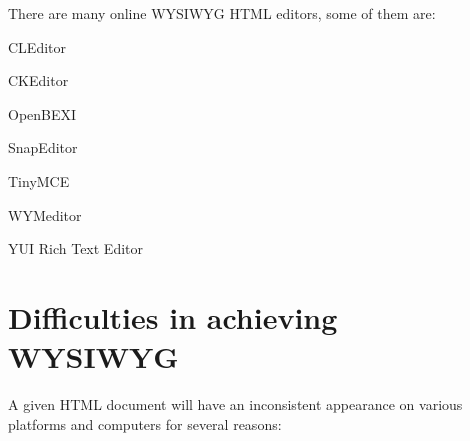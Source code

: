 There are many online WYSIWYG HTML editors, some of them are:

\begin{compactitem}
\item CLEditor
\item CKEditor
\item OpenBEXI
\item SnapEditor
\item TinyMCE
\item WYMeditor
\item YUI Rich Text Editor
\end{compactitem}

\section{Difficulties in achieving WYSIWYG}


A given HTML document will have an inconsistent appearance on various platforms and computers for several reasons:

